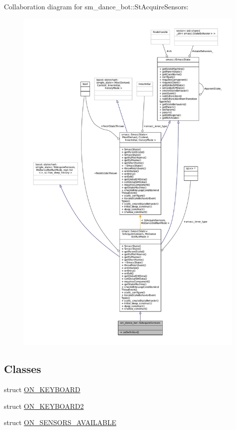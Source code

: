 Collaboration diagram for sm\+\_\+dance\+\_\+bot\+:\+:St\+Acquire\+Sensors\+:
\nopagebreak
\begin{figure}[H]
\begin{center}
\leavevmode
\includegraphics[width=350pt]{structsm__dance__bot_1_1StAcquireSensors__coll__graph}
\end{center}
\end{figure}
\subsection*{Classes}
\begin{DoxyCompactItemize}
\item 
struct \hyperlink{structsm__dance__bot_1_1StAcquireSensors_1_1ON__KEYBOARD}{O\+N\+\_\+\+K\+E\+Y\+B\+O\+A\+RD}
\item 
struct \hyperlink{structsm__dance__bot_1_1StAcquireSensors_1_1ON__KEYBOARD2}{O\+N\+\_\+\+K\+E\+Y\+B\+O\+A\+R\+D2}
\item 
struct \hyperlink{structsm__dance__bot_1_1StAcquireSensors_1_1ON__SENSORS__AVAILABLE}{O\+N\+\_\+\+S\+E\+N\+S\+O\+R\+S\+\_\+\+A\+V\+A\+I\+L\+A\+B\+LE}
\end{DoxyCompactItemize}
